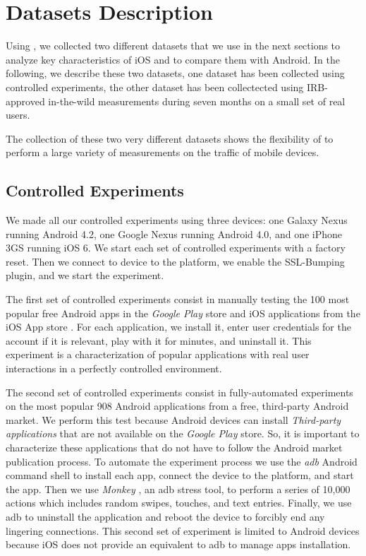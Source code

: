 \section{Datasets Description}
\label{sec:dataset}
Using \platname, we collected two different datasets that we use in the
next sections to analyze key characteristics of iOS and to compare them
with Android. In the following, we describe these two datasets, one
dataset has been collected using controlled experiments, the other
dataset has been collectected using IRB-approved in-the-wild
measurements during seven months on a small set of real users. 

The collection of these two very different datasets shows the
flexibility of \platname{} to perform a large variety of measurements
on the traffic of mobile devices. 

\subsection{Controlled Experiments}
\label{sec:dataset-contr-exper}
We made all our controlled experiments using three devices: one Galaxy
Nexus running Android 4.2, one Google Nexus running Android 4.0, and
one iPhone 3GS running iOS 6. We start each set of controlled experiments
 with a factory reset. Then we connect to device to the
\platname{} platform, we enable the SSL-Bumping plugin, and we start
the experiment. 

The first set of controlled experiments consist in manually testing the
100 most popular free Android apps in the \emph{Google Play} store and \tbd{}
iOS applications from the iOS App store . For each
application, we install it, enter user credentials for the account if
it is relevant, play with it for \tbd{} minutes, and uninstall
it. This experiment is a characterization of popular applications with
real user interactions in a perfectly controlled environment. 

The second set of controlled experiments consist in fully-automated
experiments on the most popular 908 Android applications from a free,
third-party Android market.
We perform this test because Android devices can install
\emph{Third-party applications} that are not available on the
\emph{Google Play} store. So, it is important to characterize these
applications that do not have to follow the Android market publication
process. To
automate the experiment process we use the \emph{adb} Android command shell to
install each app, connect the device to the \platname{} platform, and
start the app. Then we use \emph{Monkey} , an adb
stress tool, to perform a series of 10,000 actions which includes
random swipes, touches, and text entries.  Finally, we use adb to
uninstall the application and reboot the device to forcibly end any
lingering connections. This second set of experiment is limited to
Android devices because iOS does not provide an equivalent to adb to
manage apps installation. 

